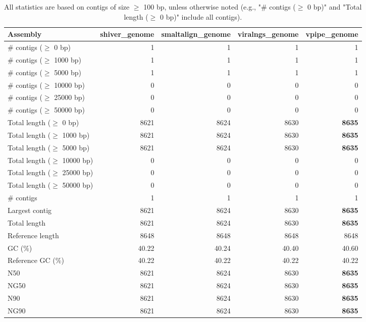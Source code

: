 \documentclass[12pt,a4paper]{article}
\begin{document}
\begin{table}[ht]
\begin{center}
\caption{All statistics are based on contigs of size $\geq$ 100 bp, unless otherwise noted (e.g., "\# contigs ($\geq$ 0 bp)" and "Total length ($\geq$ 0 bp)" include all contigs).}
\begin{tabular}{|l*{4}{|r}|}
\hline
Assembly & shiver\_genome & smaltalign\_genome & viralngs\_genome & vpipe\_genome \\ \hline
\# contigs ($\geq$ 0 bp) & 1 & 1 & 1 & 1 \\ \hline
\# contigs ($\geq$ 1000 bp) & 1 & 1 & 1 & 1 \\ \hline
\# contigs ($\geq$ 5000 bp) & 1 & 1 & 1 & 1 \\ \hline
\# contigs ($\geq$ 10000 bp) & 0 & 0 & 0 & 0 \\ \hline
\# contigs ($\geq$ 25000 bp) & 0 & 0 & 0 & 0 \\ \hline
\# contigs ($\geq$ 50000 bp) & 0 & 0 & 0 & 0 \\ \hline
Total length ($\geq$ 0 bp) & 8621 & 8624 & 8630 & {\bf 8635} \\ \hline
Total length ($\geq$ 1000 bp) & 8621 & 8624 & 8630 & {\bf 8635} \\ \hline
Total length ($\geq$ 5000 bp) & 8621 & 8624 & 8630 & {\bf 8635} \\ \hline
Total length ($\geq$ 10000 bp) & 0 & 0 & 0 & 0 \\ \hline
Total length ($\geq$ 25000 bp) & 0 & 0 & 0 & 0 \\ \hline
Total length ($\geq$ 50000 bp) & 0 & 0 & 0 & 0 \\ \hline
\# contigs & 1 & 1 & 1 & 1 \\ \hline
Largest contig & 8621 & 8624 & 8630 & {\bf 8635} \\ \hline
Total length & 8621 & 8624 & 8630 & {\bf 8635} \\ \hline
Reference length & 8648 & 8648 & 8648 & 8648 \\ \hline
GC (\%) & 40.22 & 40.24 & 40.40 & 40.60 \\ \hline
Reference GC (\%) & 40.22 & 40.22 & 40.22 & 40.22 \\ \hline
N50 & 8621 & 8624 & 8630 & {\bf 8635} \\ \hline
NG50 & 8621 & 8624 & 8630 & {\bf 8635} \\ \hline
N90 & 8621 & 8624 & 8630 & {\bf 8635} \\ \hline
NG90 & 8621 & 8624 & 8630 & {\bf 8635} \\ \hline

\end{tabular}
\end{center}
\end{table}
\end{document}
